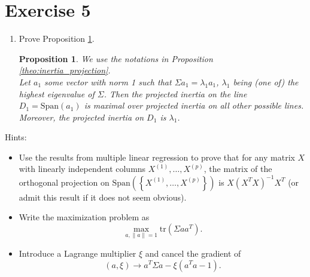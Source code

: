 \documentclass[
  11pt,
  a4paper,
]{article}
\newtheorem{proposition}{Proposition}
\begin{document}
\hypertarget{exercise-5}{%
\section{Exercise 5}\label{exercise-5}}

\begin{enumerate}
\item Prove Proposition \ref{theo:inertia_optimization}. 
\begin{proposition}
        We use the notations in Proposition \ref{theo:inertia_projection}.\\
        Let $a_1$ some vector with norm 1 such that $\Sigma a_1 = \lambda_1 a_1$, $\lambda_1$ being (one of) the highest eigenvalue of $\Sigma$. Then the projected inertia on the line $D_1={\mbox{Span}}(a_1)$ is maximal over projected inertia on all other possible lines. \\
        Moreover, the projected inertia on $D_1$ is $\lambda_1$.    
    \label{theo:inertia_optimization}       
\end{proposition}
\end{enumerate}

Hints:

\begin{itemize}
    \item Use the results from multiple linear regression to prove that for any matrix $X$ with linearly independent columns $X^{(1)},\ldots, X^{(p)}$, the matrix of the orthogonal projection on ${\mbox{Span}}\left(\left\lbrace X^{(1)},\ldots, X^{(p)}\right\rbrace\right)$ is $X (X^T X)^{-1} X^T$ (or admit this result if it does not seem obvious).
    \item Write the maximization problem as 
    $$
    \max\limits_{a, \|a\|=1} {\mbox{tr}}(\Sigma a a^T).
    $$
    \item Introduce a Lagrange multiplier $\xi$ and cancel the gradient of 
    $$
    (a, \xi) \rightarrow a^T \Sigma a - \xi (a^T a-1).
    $$
    \end{itemize}
\end{document}

